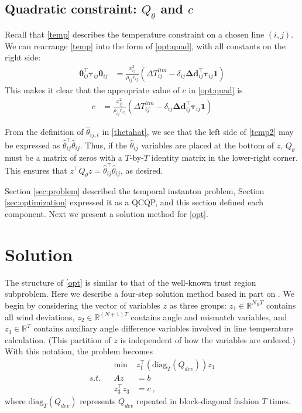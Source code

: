 \documentclass[conference]{IEEEtran}
\begin{document}
\subsection{Quadratic constraint: $Q_{\theta}$ and $c$}\label{sec:Qtheta}

Recall that \eqref{temp} describes the temperature constraint on a chosen line $(i,j)$. We can rearrange \eqref{temp} into the form of \eqref{opt:quad}, with all constants on the right side:
\begin{align}\label{temp2}
\boldsymbol{\theta}_{ij}^\top \boldsymbol{\tau}_{ij} \boldsymbol{\theta}_{ij} &=  \frac{x_{ij}^2}{\rho_{ij} r_{ij}} \left(\Delta T_{ij}^{lim} - \delta_{ij} \boldsymbol{\Delta d}_{ij}^\top \boldsymbol{\tau}_{ij}\mathbf{1}\right)
\end{align}
This makes it clear that the appropriate value of $c$ in \eqref{opt:quad} is
\begin{align}
c &= \frac{x_{ij}^2}{\rho_{ij} r_{ij}} \left(\Delta T_{ij}^{lim} - \delta_{ij} \boldsymbol{\Delta d}_{ij}^\top \boldsymbol{\tau}_{ij}\mathbf{1}\right)
\end{align}

From the definition of $\hat{\theta}_{ij,t}$ in \eqref{thetahat}, we see that the left side of \eqref{temp2} may be expressed as $\hat{\theta}_{ij}^\top \hat{\theta}_{ij}$. Thus, if the $\hat{\theta}_{ij}$ variables are placed at the bottom of $z$, $Q_{\theta}$ must be a matrix of zeros with a $T$-by-$T$ identity matrix in the lower-right corner. This ensures that $z^\top Q_\theta z = \hat{\theta}_{ij}^\top\hat{\theta}_{ij}$, as desired.

Section \ref{sec:problem} described the temporal instanton problem, Section \ref{sec:optimization} expressed it as a QCQP, and this section defined each component. Next we present a solution method for \eqref{opt}.


\section{Solution}\label{sec:solution}

The structure of \eqref{opt} is similar to that of the well-known trust region subproblem. Here we describe a four-step solution method based in part on \cite{bienstock2014}. We begin by considering the vector of variables $z$ as three groups: $z_1\in\mathbb{R}^{N_RT}$ contains all wind deviations, $z_2\in\mathbb{R}^{(N+1)T}$ contains angle and mismatch variables, and $z_3\in\mathbb{R}^T$ contains auxiliary angle difference variables involved in line temperature calculation. (This partition of $z$ is independent of how the variables are ordered.) With this notation, the problem becomes
\begin{subequations}\label{optpart}
\begin{align}
&& \min~ & z_1^\top\left( \text{diag}_T(Q_{dev})\right) z_1 \\
s.t. && Az &= b \\
&& z_3^\top z_3 &= c~,
\end{align}
\end{subequations}
where $\text{diag}_T(Q_{dev})$ represents $Q_{dev}$ repeated in block-diagonal fashion $T$ times.
\end{document}
